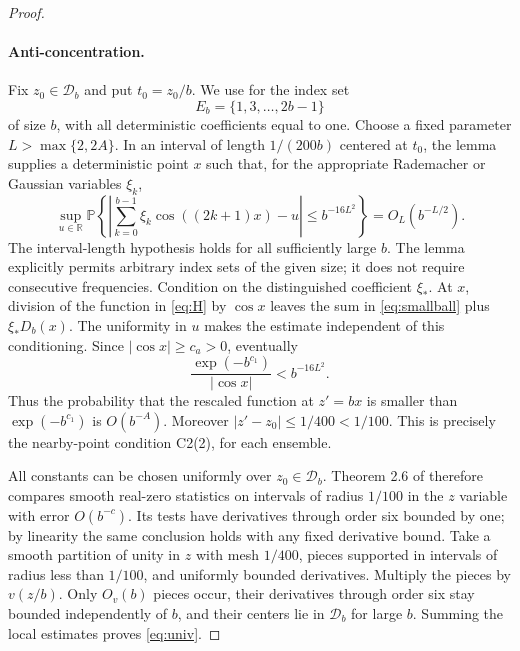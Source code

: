 \documentclass[11pt]{article}
\newcommand{\Prob}{\mathbb P}
\newcommand{\R}{\mathbb R}
\begin{document}
\begin{proof}
\paragraph{Anti-concentration.}
Fix $z_0\in\mathcal D_b$ and put $t_0=z_0/b$. We use
\cite[Lemma 9.2]{NV} for the index set
\[
 E_b=\{1,3,\ldots,2b-1\}
\]
of size $b$, with all deterministic coefficients equal to one.
Choose a fixed parameter $L>\max\{2,2A\}$. In an interval of length
$1/(200b)$ centered at $t_0$, the lemma supplies a deterministic point
$x$ such that, for the appropriate Rademacher or Gaussian variables
$\xi_k$,
\begin{equation}\label{eq:smallball}
 \sup_{u\in\R}\Prob\left\{
 \left|\sum_{k=0}^{b-1}\xi_k\cos((2k+1)x)-u\right|
 \le b^{-16L^2}\right\}=O_L(b^{-L/2}).
\end{equation}
The interval-length hypothesis holds for all sufficiently large $b$.
The lemma explicitly permits arbitrary index sets of the given size;
it does not require consecutive frequencies.
Condition on the distinguished coefficient $\xi_*$. At $x$, division
of the function in \eqref{eq:H} by $\cos x$ leaves the sum in
\eqref{eq:smallball} plus $\xi_*D_b(x)$.
The uniformity in $u$ makes the estimate independent of this conditioning.
Since $|\cos x|\ge c_a>0$, eventually
\[
 \frac{\exp(-b^{c_1})}{|\cos x|}<b^{-16L^2}.
\]
Thus the probability that the rescaled function at $z'=bx$ is smaller
than $\exp(-b^{c_1})$ is $O(b^{-A})$.
Moreover $|z'-z_0|\le1/400<1/100$.
This is precisely the nearby-point condition C2(2), for each ensemble.

All constants can be chosen uniformly over $z_0\in\mathcal D_b$.
Theorem 2.6 of \cite{NV} therefore compares smooth real-zero statistics
on intervals of radius $1/100$ in the $z$ variable with error $O(b^{-c})$.
Its tests have derivatives through order six bounded by one; by linearity
the same conclusion holds with any fixed derivative bound.
Take a smooth partition of unity in $z$ with mesh $1/400$, pieces supported
in intervals of radius less than $1/100$, and uniformly bounded derivatives.
Multiply the pieces by $v(z/b)$. Only $O_v(b)$ pieces occur, their derivatives
through order six stay bounded independently of $b$, and their centers lie
in $\mathcal D_b$ for large $b$. Summing the local estimates proves
\eqref{eq:univ}.
\end{proof}
\end{document}
